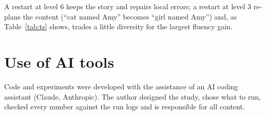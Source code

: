 \documentclass[10pt]{article}
\begin{document}
A restart at level 6 keeps the story and repairs local errors; a restart at level 3 re-plans the content (``cat named Amy'' becomes ``girl named Amy'') and, as Table~\ref{tab:ts} shows, trades a little diversity for the largest fluency gain.

\section*{Use of AI tools}

Code and experiments were developed with the assistance of an AI coding assistant (Claude, Anthropic). The author designed the study, chose what to run, checked every number against the run logs and is responsible for all content.
\end{document}
